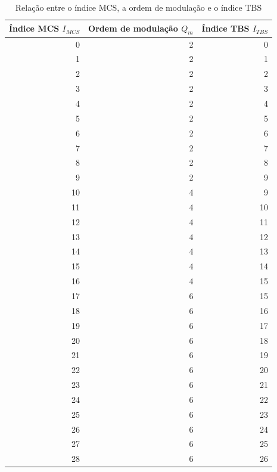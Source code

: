\documentclass[journal,11pt,twocolumn]{IEEEtran}
\begin{document}
\begin{table}[h!]
    \centering
    \begin{tabular}{r|r|r}
        \makecell[c]{\textbf{Índice MCS}\\ $I_{MCS}$} & \makecell[c]{Ordem de modulação\\$Q_{m}$} & \makecell[c]{Índice TBS\\$I_{TBS}$} \\
        \hline
        0 & 2 & 0\\
        1 & 2 & 1\\
        2 & 2 & 2\\
        3 & 2 & 3\\
        4 & 2 & 4\\
        5 & 2 & 5\\
        6 & 2 & 6\\        
        7 & 2 & 7\\ 
        8 & 2 & 8\\
        9 & 2 & 9\\
        10 & 4 & 9\\
        11 & 4 & 10\\
        12 & 4 & 11\\
        13 & 4 & 12\\
        14 & 4 & 13\\
        15 & 4 & 14\\        
        16 & 4 & 15\\ 
        17 & 6 & 15\\ 
        18 & 6 & 16\\
        19 & 6 & 17\\
        20 & 6 & 18\\        
        21 & 6 & 19\\ 
        22 & 6 & 20\\ 
        23 & 6 & 21\\
        24 & 6 & 22\\        
        25 & 6 & 23\\ 
        26 & 6 & 24\\ 
        27 & 6 & 25\\ 
        28 & 6 & 26
        \end{tabular}
    \caption{Relação entre o índice MCS, a ordem de modulação e o índice TBS}
    \label{tab:tbs-idx}
\end{table}
\end{document}
